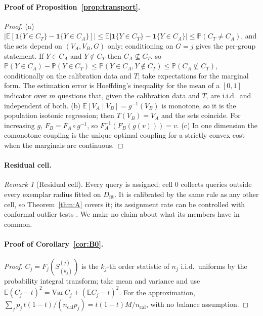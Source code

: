 \documentclass[11pt]{article}
\theoremstyle{definition}
\theoremstyle{remark}
\newtheorem{remark}[theorem]{Remark}
\newcommand{\Dfit}{D_{\mathrm{fit}}}
\newcommand{\E}{\mathbb{E}}
\renewcommand{\P}{\mathbb{P}}
\newcommand{\1}{\mathbf{1}}
\begin{document}
\paragraph{Proof of Proposition~\ref{prop:transport}.}
\begin{proof}
(a) $|\E[\1\{Y\in C_T\}-\1\{Y\in C_A\}]|\le\E|\1\{Y\in C_T\}-\1\{Y\in C_A\}|\le\P(C_T\neq C_A)$, and the sets
depend on $(V_A,V_B,G)$ only; conditioning on $G=j$ gives the per-group statement. If $Y\in C_A$ and
$Y\notin C_T$ then $C_A\not\subseteq C_T$, so $\P(Y\in C_A)-\P(Y\in C_T)\le\P(Y\in C_A,Y\notin C_T)\le
\P(C_A\not\subseteq C_T)$, conditionally on the calibration data and $T$; take expectations for the marginal
form. The estimation error is Hoeffding's inequality for the mean of a $[0,1]$ indicator over $m$
questions that, given the calibration data and $T$, are i.i.d.\ and independent of both. (b)
$\E[V_A\mid V_B]=g^{-1}(V_B)$ is monotone, so it is the population isotonic regression; then
$T(V_B)=V_A$ and the sets coincide. For increasing $g$, $F_B=F_A\circ g^{-1}$, so
$F_A^{-1}(F_B(g(v)))=v$. (c) In one dimension the comonotone coupling is the unique optimal coupling for
a strictly convex cost when the marginals are continuous.
\end{proof}

\paragraph{Residual cell.}
\begin{remark}[Residual cell]
\label{prop:D}
Every query is assigned: cell 0 collects queries outside every exemplar radius fitted on $\Dfit$.
It is calibrated by the same rule as any other cell, so Theorem~\ref{thm:A} covers it; its
assignment rate can be controlled with conformal outlier tests
\citep{bates2023testing,guan2022bcops}. We make no claim about what its members have in common.
\end{remark}

\paragraph{Proof of Corollary~\ref{cor:B0}.}
\begin{proof}
$C_j = F_j(S^{(j)}_{(k_j)})$ is the $k_j$-th order statistic of $n_j$ i.i.d.\ uniforms by
the probability integral transform; take mean and variance and use
$\E(C_j-t)^2=\mathrm{Var}\,C_j+(\E C_j-t)^2$. For the approximation,
$\sum_j p_j\,t(1-t)/(n_{\mathrm{cal}}p_j) = t(1-t)M/n_{\mathrm{cal}}$, with no balance
assumption.
\end{proof}
\end{document}
